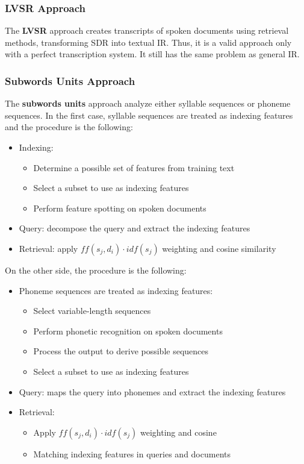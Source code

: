 \documentclass{article}
\begin{document}
\subsubsection{LVSR Approach}
The \textbf{LVSR} approach creates transcripts of spoken documents using retrieval methods, transforming SDR into textual IR. Thus, it is a valid approach only with a perfect transcription system. It still has the same problem as general IR.

\subsubsection{Subwords Units Approach}
The \textbf{subwords units} approach analyze either syllable sequences or phoneme sequences.
In the first case, syllable sequences are treated as indexing features and the procedure is the following:
\begin{itemize}
    \item Indexing:
        \begin{itemize}
            \item Determine a possible set of features from training text
            \item Select a subset to use as indexing features
            \item Perform feature spotting on spoken documents
        \end{itemize}
    \item Query: decompose the query and extract the indexing features
    \item Retrieval: apply $ff(s_j,d_i) \cdot idf(s_j)$ weighting and cosine similarity
\end{itemize}
On the other side, the procedure is the following:
\begin{itemize}
    \item Phoneme sequences are treated as indexing features:
        \begin{itemize}
            \item Select variable-length sequences
            \item Perform phonetic recognition on spoken documents
            \item Process the output to derive possible sequences
            \item Select a subset to use as indexing features
        \end{itemize}
    \item Query: maps the query into phonemes and extract the indexing features
    \item Retrieval: 
        \begin{itemize}
            \item Apply $ff(s_j,d_i) \cdot idf(s_j)$ weighting and cosine
            \item Matching indexing features in queries and documents
        \end{itemize}
\end{itemize}
\end{document}
